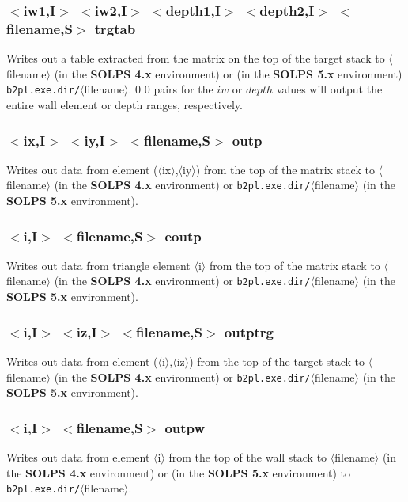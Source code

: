 \documentclass[a4paper,10pt]{report}
\newcommand\SOLPSfour{{\bf SOLPS 4.x} }
\newcommand\SOLPSfive{{\bf SOLPS 5.x} }
\begin{document}
\subsubsection{$<$iw1,{\bf I}$>$ $<$iw2,{\bf I}$>$ $<$depth1,{\bf I}$>$ $<$depth2,{\bf I}$>$ $<$filename,{\bf S}$>$ trgtab}\label{sec:trgtab}
Writes out a table extracted from the matrix on the top of the target stack to $\langle$filename$\rangle$ (in the \SOLPSfour environment)
or (in the \SOLPSfive environment) \verb:b2pl.exe.dir/:$\langle$filename$\rangle$. $0$ $0$ pairs for the $iw$ or $depth$ values will
output the entire wall element or depth ranges, respectively.

\subsubsection{$<$ix,{\bf I}$>$ $<$iy,{\bf I}$>$ $<$filename,{\bf S}$>$ outp}\label{sec:outp}
Writes out data from element ($\langle$ix$\rangle$,$\langle$iy$\rangle$) from the top of the matrix stack to $\langle$filename$\rangle$ (in the \SOLPSfour environment)
or \verb:b2pl.exe.dir/:$\langle$filename$\rangle$ (in the \SOLPSfive environment).

\subsubsection{$<$i,{\bf I}$>$ $<$filename,{\bf S}$>$ eoutp}\label{sec:eoutp}
Writes out data from triangle element $\langle$i$\rangle$ from the top of the matrix stack to $\langle$filename$\rangle$ (in the \SOLPSfour environment)
or \verb:b2pl.exe.dir/:$\langle$filename$\rangle$ (in the \SOLPSfive environment).

\subsubsection{$<$i,{\bf I}$>$ $<$iz,{\bf I}$>$ $<$filename,{\bf S}$>$ outptrg}\label{sec:outptrg}
Writes out data from element ($\langle$i$\rangle$,$\langle$iz$\rangle$) from the top of the target stack to $\langle$filename$\rangle$ (in the \SOLPSfour environment)
or \verb:b2pl.exe.dir/:$\langle$filename$\rangle$ (in the \SOLPSfive environment).

\subsubsection{$<$i,{\bf I}$>$ $<$filename,{\bf S}$>$ outpw}\label{sec:outpw}
Writes out data from element $\langle$i$\rangle$ from the top of the wall stack to $\langle$filename$\rangle$ (in the \SOLPSfour environment)
or (in the \SOLPSfive environment) to \verb:b2pl.exe.dir/:$\langle$filename$\rangle$.
\end{document}
